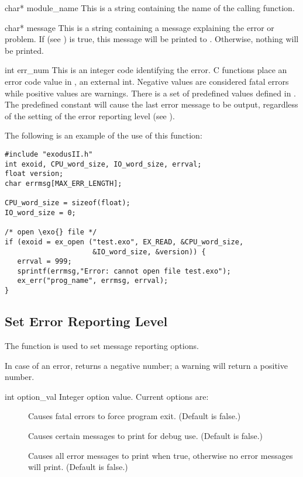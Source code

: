 \begin{parameters}
\item[{char* module_name \R{}}]
{This is a string containing the name of the calling function.}

\item[{char* message \R{}}]
This is a string containing a message explaining the error
or problem. If  (see ) is true,
this message will be printed to . Otherwise,
nothing will be printed.

\item[{int err_num \R{}}]
This is an integer code identifying the error. \exo{} C functions
place an error code value in , an external int. Negative
values are considered fatal errors while positive values are
warnings. There is a set of predefined values defined in
. The predefined constant  will
cause the last error message to be output, regardless of the setting
of the error reporting level (see ).
\end{parameters}

The following is an example of the use of this function:
\begin{lstlisting}
#include "exodusII.h"
int exoid, CPU_word_size, IO_word_size, errval;
float version;
char errmsg[MAX_ERR_LENGTH];

CPU_word_size = sizeof(float);
IO_word_size = 0;

/* open \exo{} file */
if (exoid = ex_open ("test.exo", EX_READ, &CPU_word_size,
                     &IO_word_size, &version)) {
   errval = 999;
   sprintf(errmsg,"Error: cannot open file test.exo");
   ex_err("prog_name", errmsg, errval);
}
\end{lstlisting}


\subsection{Set Error Reporting Level}

The function  is used to set message reporting
options.

In case of an error,  returns a negative number; a
warning will return a positive number.


\begin{parameters}
\item[{int option_val \R{}}]
Integer option value. Current options are:

\begin{description}
\item[] Causes fatal errors to force program
exit. (Default is false.)

\item[] Causes certain messages to print
for debug use. (Default is false.)

\item[] Causes all error messages to
print when true, otherwise no error messages will print. (Default
is false.)
\end{description}
\end{parameters}


